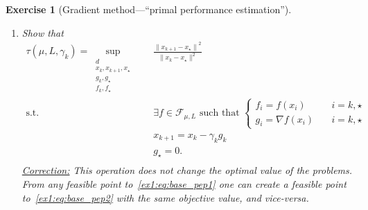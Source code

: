 \documentclass[11pt,a4paper]{article}
\DeclareMathOperator*{\argmin}{argmin}
\newcommand{\correction}[1]{{{\color{blue}\underline{Correction:} #1}}}
\newcommand{\correction}[1]{}
\newtheorem{exercise}{Exercise}
\begin{document}
\begin{exercise}[Gradient method---``primal performance estimation'']
\begin{enumerate}
	\correction{We trivially have~\eqref{ex1:eq:distance} $\Leftrightarrow \frac{\|x_{k+1}-x_\star\|^2}{\|x_k-x_\star\|^2}\leqslant \tau(\mu,L,\gamma_k)$ for any $d\in\mathbb{N}$, for any $f\in\mathcal{F}_{\mu,L}$, and for all $x_k,x_{k+1}\in\mathbb{R}^d$ such that $x_{k+1}=x_k-\gamma_k \nabla f(x_k)$, and $x_\star\in\argmin_x f(x)$ (with $x_\star\neq x_k$). It trivially follows that~\eqref{ex1:eq:base_pep1}, as:
	\begin{itemize}
	\item for any lower value of $\tau(\mu,L,\gamma_k)$, there would exist an $f\in\mathcal{F}_{\mu,L}$ and a set of points such that $\tau(\mu,L,\gamma_k)\leqslant \frac{\|x_{k+1}-x_\star\|^2}{\|x_k-x_\star\|^2}$, reaching a contradiction. Hence $\frac{\|x_{k+1}-x_\star\|^2}{\|x_k-x_\star\|^2}\leqslant \tau(\mu,L,\gamma_k)$, again.
	\item $\tau(\mu,L,\gamma_k)$ is defined as the smallest value such that~\eqref{ex1:eq:distance} is valid (for all ...). Hence $\tau(\mu,L,\gamma_k)=\sup \frac{\|x_{k+1}-x_\star\|^2}{\|x_k-x_\star\|^2}$.
	\end{itemize}}
	\item Show that
	\begin{equation}\label{ex1:eq:base_pep2}
		\begin{aligned}
		\tau(\mu,L,\gamma_k)=\sup_{\substack{d\\x_k,x_{k+1},x_\star\\g_k,g_\star\\f_k,f_\star}} \quad & \frac{{\|x_{k+1}-x_\star\|}^2}{\|x_k-x_\star\|^2}\\
		\text{s.t. } & \exists f\in\mathcal{F}_{\mu,L} \text{ such that }\left\{\begin{array}{ll}
			f_i=f(x_i)\quad & i=k,\star\\
			g_i=\nabla f(x_i)\quad & i=k,\star
			\end{array}\right.\\
		& x_{k+1}=x_k-\gamma_k  g_k\\
		& g_\star=0.\\
		\end{aligned}
		\end{equation}
	\correction{This operation does not change the optimal value of the problems. From any feasible point to~\eqref{ex1:eq:base_pep1} one can create a feasible point to~\eqref{ex1:eq:base_pep2} with the same objective value, and vice-versa.}
	

\end{enumerate}
\end{exercise}
\end{document}
